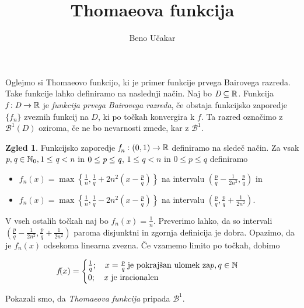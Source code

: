 \documentclass[a4paper, 12pt]{article}
\title{Thomaeova funkcija}
\author{Beno Učakar}
\date{}
\newcommand{\B}{\mathscr{B}^1}
\newcommand{\R}{\mathcal{R}}
\newcommand{\N}{\mathbb{N}}
\theoremstyle{definition}
\newtheorem{zgled}{Zgled}
\def\R{\mathbb{R}}  %
\begin{document}
\maketitle

Oglejmo si Thomaeovo funkcijo, ki je primer funkcije prvega Bairovega razreda.
Take funkcije lahko definiramo na naslednji način.
Naj bo $\emph{D} \subseteq \R$. Funkcija $\emph{f} : \emph{D} \to \R $ je \emph{funkcija prvega Bairovega razreda}, 
če obstaja funkcijsko zaporedje $\{f_n\}$ zveznih funkcij na $D$, ki po točkah konvergira k $f$. 
Ta razred označimo z $\B(D)$ oziroma, če ne bo nevarnosti zmede, kar z $\B$.

\begin{zgled}
Funkcijsko zaporedje $\emph{f}_n :(0,1) \to \R$ definiramo na sledeč način.
    Za vsak $\emph{p},\emph{q} \in \N_0 , 1 \le \emph{q} < \emph{n}$ in $0 \le \emph{p} \le \emph{q} $, $1 \le q < n$ in $0 \le p \le q$ definiramo
    \begin{itemize}
        \item \(f_n(x) = \max\left\{\frac{1}{n}, \frac{1}{q} + 2n^2\left(x - \frac{p}{q}\right)\right\}\) na intervalu \(\left(\frac{p}{q} - \frac{1}{2n^2}, \frac{p}{q}\right)\) in
        \item \(f_n(x) = \max\left\{\frac{1}{n}, \frac{1}{q} - 2n^2\left(x - \frac{p}{q}\right)\right\}\) na intervalu \(\left(\frac{p}{q}, \frac{p}{q} + \frac{1}{2n^2}\right)\).
    \end{itemize}
    V vseh ostalih točkah naj bo $f_n(x) = \frac{1}{n}$.
    Preverimo lahko, da so intervali $\left(\frac{p}{q} - \frac{1}{2n^2}, \frac{p}{q} + \frac{1}{2n^2}\right)$ paroma disjunktni in zgornja definicija je dobra.
    Opazimo, da je $f_n(x)$ odsekoma linearna zvezna. Če vzamemo limito po točkah, dobimo

    $$
    \emph{f}(x) = \begin{cases}
         \frac{1}{q}; \quad x = \frac{p}{q} \: \text{je pokrajšan ulomek za} p, q \in \N \\
        0; \quad \text{\emph{x} je iracionalen}
    \end{cases}
    $$

    Pokazali smo, da \emph{Thomaeova funkcija} pripada $\B$. 
\end{zgled}
    




\nocite{*}
\end{document}
